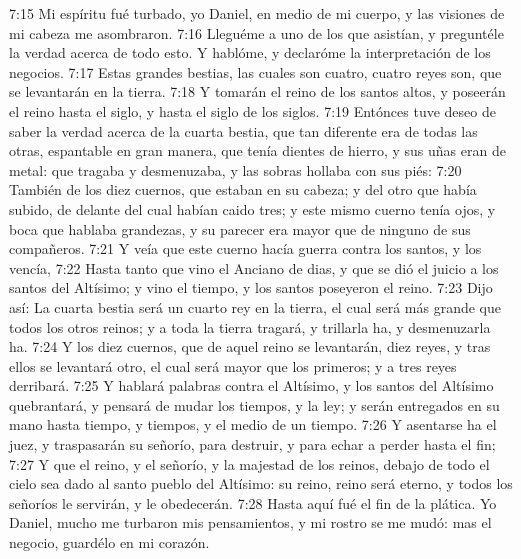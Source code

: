 7:15 Mi espíritu fué turbado, yo Daniel, en medio de mi cuerpo, y las visiones de mi cabeza me asombraron.
7:16 Lleguéme a uno de los que asistían, y preguntéle la verdad acerca de todo esto. Y hablóme, y declaróme la interpretación de los negocios.
7:17 Estas grandes bestias, las cuales son cuatro, cuatro reyes son, que se levantarán en la tierra.
7:18 Y tomarán el reino de los santos altos, y poseerán el reino hasta el siglo, y hasta el siglo de los siglos.
7:19 Entónces tuve deseo de saber la verdad acerca de la cuarta bestia, que tan diferente era de todas las otras, espantable en gran manera, que tenía dientes de hierro, y sus uñas eran de metal: que tragaba y desmenuzaba, y las sobras hollaba con sus piés:
7:20 También de los diez cuernos, que estaban en su cabeza; y del otro que había subido, de delante del cual habían caido tres; y este mismo cuerno tenía ojos, y boca que hablaba grandezas, y su parecer era mayor que de ninguno de sus compañeros.
7:21 Y veía que este cuerno hacía guerra contra los santos, y los vencía,
7:22 Hasta tanto que vino el Anciano de dias, y que se dió el juicio a los santos del Altísimo; y vino el tiempo, y los santos poseyeron el reino.
7:23 Dijo así: La cuarta bestia será un cuarto rey en la tierra, el cual será más grande que todos los otros reinos; y a toda la tierra tragará, y trillarla ha, y desmenuzarla ha.
7:24 Y los diez cuernos, que de aquel reino se levantarán, diez reyes, y tras ellos se levantará otro, el cual será mayor que los primeros; y a tres reyes derribará.
7:25 Y hablará palabras contra el Altísimo, y los santos del Altísimo quebrantará, y pensará de mudar los tiempos, y la ley; y serán entregados en su mano hasta tiempo, y tiempos, y el medio de un tiempo.
7:26 Y asentarse ha el juez, y traspasarán su señorío, para destruir, y para echar a perder hasta el fin;
7:27 Y que el reino, y el señorío, y la majestad de los reinos, debajo de todo el cielo sea dado al santo pueblo del Altísimo: su reino, reino será eterno, y todos los señoríos le servirán, y le obedecerán.
7:28 Hasta aquí fué el fin de la plática. Yo Daniel, mucho me turbaron mis pensamientos, y mi rostro se me mudó: mas el negocio, guardélo en mi corazón.

